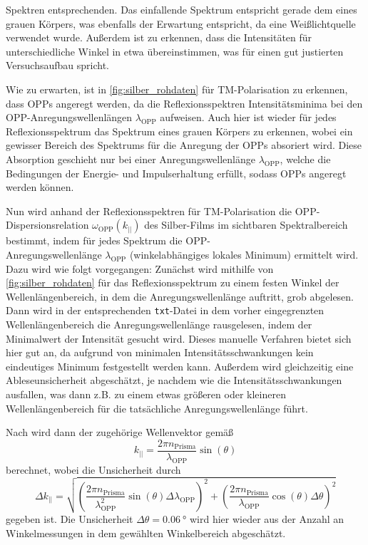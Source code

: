 Spektren entsprechenden. Das einfallende Spektrum entspricht gerade dem eines grauen Körpers, was ebenfalls der Erwartung entspricht, da eine Weißlichtquelle
verwendet wurde. Außerdem ist zu erkennen, dass die Intensitäten für unterschiedliche Winkel in etwa übereinstimmen, was für einen gut justierten Versuchsaufbau spricht.\par
Wie zu erwarten, ist in \cref{fig:silber_rohdaten} für TM-Polarisation zu erkennen, dass OPPs angeregt werden, da die Reflexionsspektren Intensitätsminima
bei den OPP-Anregungswellenlängen $\lambda_{\mathrm{OPP}}$ aufweisen. Auch hier ist wieder für jedes Reflexionsspektrum das Spektrum eines grauen Körpers zu erkennen,
wobei ein gewisser Bereich des Spektrums für die Anregung der OPPs absoriert wird. Diese Absorption geschieht nur bei einer Anregungswellenlänge $\lambda_{\mathrm{OPP}}$,
welche die Bedingungen der Energie- und Impulserhaltung erfüllt, sodass OPPs angeregt werden können.\par
Nun wird anhand der Reflexionsspektren für TM-Polarisation die OPP-Dispersionsrelation $\omega_{\mathrm{OPP}}(k_{||})$ des Silber-Films im sichtbaren Spektralbereich
bestimmt, indem für jedes Spektrum die OPP-\\Anregungswellenlänge $\lambda_{\mathrm{OPP}}$ (winkelabhängiges lokales Minimum) ermittelt wird. Dazu wird wie folgt vorgegangen:
Zunächst wird mithilfe von \cref{fig:silber_rohdaten} für das Reflexionsspektrum zu einem festen Winkel der Wellenlängenbereich, in dem die Anregungswellenlänge auftritt, grob abgelesen.
Dann wird in der entsprechenden \texttt{txt}-Datei in dem vorher eingegrenzten Wellenlängenbereich die Anregungswellenlänge rausgelesen, indem der Minimalwert
der Intensität gesucht wird. Dieses manuelle Verfahren bietet sich hier gut an, da aufgrund von minimalen Intensitätsschwankungen kein eindeutiges Minimum
festgestellt werden kann. Außerdem wird gleichzeitig eine Ableseunsicherheit abgeschätzt, je nachdem wie die Intensitätsschwankungen ausfallen, was dann z.B.
zu einem etwas größeren oder kleineren Wellenlängenbereich für die tatsächliche Anregungswellenlänge führt.\par
Nach \cite{skript} wird dann der zugehörige Wellenvektor gemäß
\begin{equation*}
	k_{||} = \frac{2\pi n_{\mathrm{Prisma}}}{\lambda_{\mathrm{OPP}}} \sin(\theta)
\end{equation*} berechnet, wobei die Unsicherheit durch
\begin{equation*}
	\Delta k_{||} = \sqrt{\left(\frac{2\pi n_{\mathrm{Prisma}}}{\lambda_{\mathrm{OPP}}^2} \sin(\theta) \Delta \lambda_{\mathrm{OPP}}\right)^2 + \left(\frac{2\pi n_{\mathrm{Prisma}}}{\lambda_{\mathrm{OPP}}} \cos(\theta) \Delta \theta\right)^2}
\end{equation*} gegeben ist. Die Unsicherheit $\Delta \theta = \SI{0,06}{\degree}$ wird hier wieder aus der Anzahl an Winkelmessungen in dem gewählten Winkelbereich abgeschätzt.
